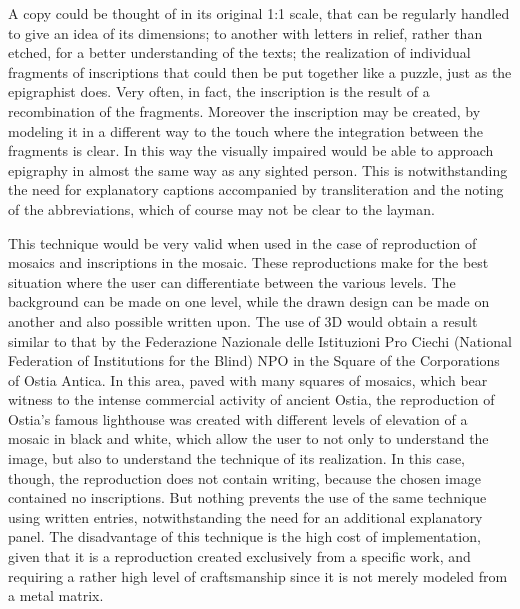 \documentclass[amsthm,ebook]{saparticle}
\begin{document}
A copy could be thought of in its original 1:1 scale, that can be regularly handled to give an idea of its dimensions;
to another with letters in relief, rather than etched, for a better understanding of the texts; the realization of
individual fragments of inscriptions that could then be put together like a puzzle, just as the epigraphist does. Very
often, in fact, the inscription is the result of a recombination of the fragments. Moreover the inscription may be
created, by modeling it in a different way to the touch where the integration between the fragments is clear. In this
way the visually impaired would be able to approach epigraphy in almost the same way as any sighted person. This is
notwithstanding the need for explanatory captions accompanied by transliteration and the noting of the abbreviations,
which of course may not be clear to the layman.

This technique would be very valid when used in the case of reproduction of mosaics and inscriptions in the mosaic.
These reproductions make for the best situation where the user can differentiate between the various levels. The
background can be made on one level, while the drawn design can be made on another and also possible written upon. The
use of 3D would obtain a result similar to that by the Federazione Nazionale delle Istituzioni Pro Ciechi (National
Federation of Institutions for the Blind) NPO in the Square of the Corporations of Ostia Antica. In this area, paved
with many squares of mosaics, which bear witness to the intense commercial activity of ancient Ostia, the reproduction
of Ostia’s famous lighthouse was created with different levels of elevation of a mosaic in black and white, which allow
the user to not only to understand the image, but also to understand the technique of its realization. In this case,
though, the reproduction does not contain writing, because the chosen image contained no inscriptions. But nothing
prevents the use of the same technique using written entries, notwithstanding the need for an additional explanatory
panel. The disadvantage of this technique is the high cost of implementation, given that it is a reproduction created
exclusively from a specific work, and requiring a rather high level of craftsmanship since it is not merely modeled
from a metal matrix.
\end{document}
